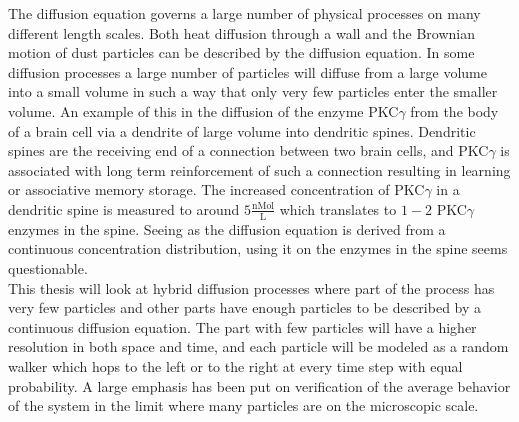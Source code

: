 The diffusion equation governs a large number of physical processes on many different length scales. 
Both heat diffusion through a wall and the Brownian motion of dust particles can be described by the diffusion equation. 
In some diffusion processes a large number of particles will diffuse from a large volume into a small volume in such a way that only very few particles enter the smaller volume. 
An example of this in the diffusion of the enzyme PKC$\gamma$ from the body of a brain cell via a dendrite of large volume into dendritic spines. 
Dendritic spines are the receiving end of a connection between two brain cells, and PKC$\gamma$ is associated with long term reinforcement of such a connection resulting in learning or associative memory storage. 
The increased concentration of PKC$\gamma$ in a dendritic spine is measured to around $5\frac{\text{nMol}}{\text{L}}$ which translates to $1-2$ PKC$\gamma$ enzymes in the spine. 
Seeing as the diffusion equation is derived from a continuous concentration distribution, using it on the enzymes in the spine seems questionable. \\

This thesis will look at hybrid diffusion processes where part of the process has very few particles and other parts have enough particles to be described by a continuous diffusion equation. 
The part with few particles will have a higher resolution in both space and time, and each particle will be modeled as a random walker which hops to the left or to the right at every time step with equal probability. 
A large emphasis has been put on verification of the average behavior of the system in the limit where many particles are on the microscopic scale.
